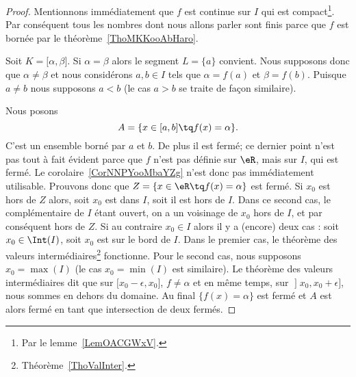 \begin{proof}
	Mentionnons immédiatement que \( f\) est continue sur \( I\) qui est compact\footnote{Par le lemme~\ref{LemOACGWxV}.}. Par conséquent tous les nombres dont nous allons parler sont finis parce que \( f\) est bornée par le théorème~\ref{ThoMKKooAbHaro}.

	Soit \( K=\mathopen[ \alpha , \beta \mathclose]\). Si \( \alpha=\beta\) alors le segment \( L=\{ a \}\) convient. Nous supposons donc que \( \alpha\neq \beta\) et nous considérons \( a,b\in I\) tels que \( \alpha=f(a)\) et \( \beta=f(b)\). Puisque \( a\neq b\) nous supposons \( a<b\) (le cas \( a>b\) se traite de façon similaire).

	Nous posons
	\begin{equation}
		A=\{ x\in\mathopen[ a , b \mathclose]\tq f(x)=\alpha \}.
	\end{equation}
	C'est un ensemble borné par \( a\) et \( b\). De plus il est fermé; ce dernier point n'est pas tout à fait évident parce que \( f\) n'est pas définie sur \( \eR\), mais sur \( I\), qui est fermé. Le corolaire~\ref{CorNNPYooMbaYZg} n'est donc pas immédiatement utilisable. Prouvons donc que \( Z=\{ x\in \eR\tq f(x)=\alpha \}\) est fermé. Si \( x_0\) est hors de \( Z\) alors, soit \( x_0\) est dans \( I\), soit il est hors de \( I\). Dans ce second cas, le complémentaire de \( I\) étant ouvert, on a un voisinage de \( x_0\) hors de \( I\), et par conséquent hors de \( Z\). Si au contraire \( x_0\in I\) alors il y a (encore) deux cas : soit \( x_0\in\Int(I)\), soit \( x_0\) est sur le bord de \( I\). Dans le premier cas, le théorème des valeurs intermédiaires\footnote{Théorème~\ref{ThoValInter}.} fonctionne. Pour le second cas, nous supposons \( x_0=\max(I)\) (le cas \( x_0=\min(I)\) est similaire). Le théorème des valeurs intermédiaires dit que sur \( \mathopen[ x_0-\epsilon , x_0 \mathclose]\), \( f\neq \alpha\) et en même temps, sur \( \mathopen] x_0 , x_0+\epsilon \mathclose]\), nous sommes en dehors du domaine. Au final \( \{ f(x)=\alpha \}\) est fermé et \( A\) est alors fermé en tant que intersection de deux fermés.


\end{proof}
